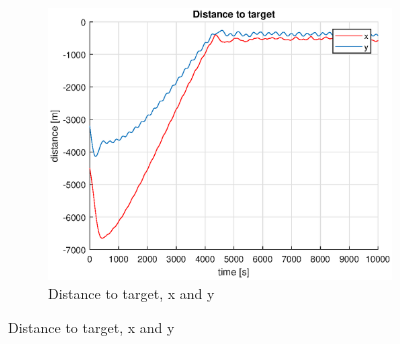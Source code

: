 \begin{figure}[ht]
	~
	\begin{subfigure}[b]{0.3\textwidth}
		\includegraphics[width=\textwidth]{x_y_distance_to_target2_7}
		\caption{Distance to target, x and y}
		\label{fig:x_y_distance_to_target2_7}
	\end{subfigure}
	\label{fig:task2_7}
\end{figure}